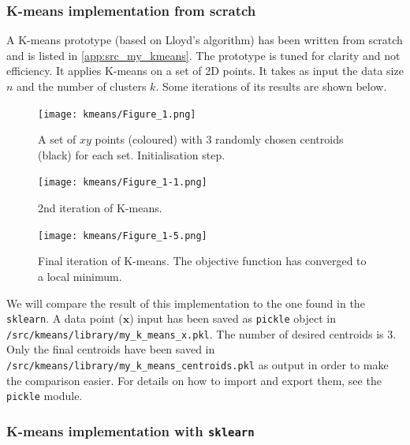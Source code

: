 \documentclass[a4paper]{article}
\begin{document}
\subsubsection{K-means implementation from scratch}

A K-means prototype (based on Lloyd's algorithm) has been written from scratch and is listed in \ref{app:src_my_kmeans}. The prototype is tuned for clarity and not efficiency. It applies K-means on a set of 2D points. It takes as input the data size $n$ and the number of clusters $k$. Some iterations of its results are shown below.
\begin{multicols}{3}
\begin{figure}[H]
	\centering %
    	\texttt{[image: kmeans/Figure\_1.png]}
    \caption{A set of $xy$ points (coloured) with 3 randomly chosen centroids (black) for each set. Initialisation step.}
\end{figure}

\columnbreak
\begin{figure}[H]
	\centering %
    	\texttt{[image: kmeans/Figure\_1-1.png]}
    \caption{2nd iteration of K-means.}
\end{figure}

\columnbreak
\begin{figure}[H]
	\centering %
    	\texttt{[image: kmeans/Figure\_1-5.png]}
    \caption{Final iteration of K-means. The objective function has converged to a local minimum.}
\end{figure}

\end{multicols}
We will compare the result of this implementation to the one found in the \texttt{sklearn}. A data point ($\textbf{x}$) input has been saved as \texttt{pickle} object in \texttt{/src/kmeans/library/my_k_means_x.pkl}. The number of desired centroids is 3. Only the final centroids have been saved in  \texttt{/src/kmeans/library/my_k_means_centroids.pkl} as output in order to make the comparison easier. For details on how to import and export them, see the \texttt{pickle} module.




\subsubsection{K-means implementation with \texttt{sklearn}}
\end{document}
